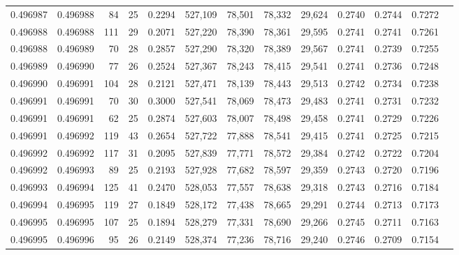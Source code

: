 \begin{tabular}{rrrrrrrrrrrrr}
0.496987 & 0.496988 &  84 &  25 &                                     0.2294 & 527,109 &  78,501 &  78,332 &  29,624 & 0.2740 & 0.2744 & 0.7272 \\
0.496988 & 0.496988 & 111 &  29 &                                     0.2071 & 527,220 &  78,390 &  78,361 &  29,595 & 0.2741 & 0.2741 & 0.7261 \\
0.496988 & 0.496989 &  70 &  28 &                                     0.2857 & 527,290 &  78,320 &  78,389 &  29,567 & 0.2741 & 0.2739 & 0.7255 \\
0.496989 & 0.496990 &  77 &  26 &                                     0.2524 & 527,367 &  78,243 &  78,415 &  29,541 & 0.2741 & 0.2736 & 0.7248 \\
0.496990 & 0.496991 & 104 &  28 &                                     0.2121 & 527,471 &  78,139 &  78,443 &  29,513 & 0.2742 & 0.2734 & 0.7238 \\
0.496991 & 0.496991 &  70 &  30 &                                     0.3000 & 527,541 &  78,069 &  78,473 &  29,483 & 0.2741 & 0.2731 & 0.7232 \\
0.496991 & 0.496991 &  62 &  25 &                                     0.2874 & 527,603 &  78,007 &  78,498 &  29,458 & 0.2741 & 0.2729 & 0.7226 \\
0.496991 & 0.496992 & 119 &  43 &                                     0.2654 & 527,722 &  77,888 &  78,541 &  29,415 & 0.2741 & 0.2725 & 0.7215 \\
0.496992 & 0.496992 & 117 &  31 &                                     0.2095 & 527,839 &  77,771 &  78,572 &  29,384 & 0.2742 & 0.2722 & 0.7204 \\
0.496992 & 0.496993 &  89 &  25 &                                     0.2193 & 527,928 &  77,682 &  78,597 &  29,359 & 0.2743 & 0.2720 & 0.7196 \\
0.496993 & 0.496994 & 125 &  41 &                                     0.2470 & 528,053 &  77,557 &  78,638 &  29,318 & 0.2743 & 0.2716 & 0.7184 \\
0.496994 & 0.496995 & 119 &  27 &                                     0.1849 & 528,172 &  77,438 &  78,665 &  29,291 & 0.2744 & 0.2713 & 0.7173 \\
0.496995 & 0.496995 & 107 &  25 &                                     0.1894 & 528,279 &  77,331 &  78,690 &  29,266 & 0.2745 & 0.2711 & 0.7163 \\
0.496995 & 0.496996 &  95 &  26 &                                     0.2149 & 528,374 &  77,236 &  78,716 &  29,240 & 0.2746 & 0.2709 & 0.7154 \\

\end{tabular}
